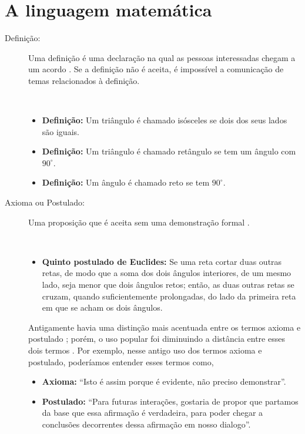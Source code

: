 
\section{A linguagem matemática}

\begin{description}

\item[Definição:]  Uma definição é uma declaração na qual as 
pessoas interessadas chegam a um acordo \cite[pp. 37]{solow1987como}.
Se a definição não é aceita, é impossível a comunicação de temas relacionados à definição.
\begin{example}~\\
\begin{itemize}
\item \textbf{Definição:} Um triângulo é chamado isósceles se dois dos seus lados são iguais.
\item \textbf{Definição:} Um triângulo é chamado retângulo se tem um ângulo com $90^{\circ}$.
\item \textbf{Definição:} Um ângulo é chamado reto se tem  $90^{\circ}$.
\end{itemize}
\end{example}

\item[Axioma ou Postulado:]   
Uma proposição que é aceita sem uma demonstração formal \cite[pp. 47]{fossa2009introducao} \cite[pp. 41]{solow1987como}.
\begin{example}~\\
\begin{itemize}
\item \textbf{Quinto postulado de Euclides:} 
Se uma reta cortar duas outras retas, de modo que a soma dos dois ângulos interiores, 
de um mesmo lado, seja menor que dois ângulos retos; então, as duas outras retas se cruzam, 
quando suficientemente prolongadas, do lado da primeira reta em que se acham os dois ângulos.
\end{itemize}
\end{example}

Antigamente havia uma distinção mais acentuada entre os termos axioma e postulado \cite[pp. 115]{de1863ensaio};
porém, o uso popular foi diminuindo a distância entre esses dois termos \cite[pp. 243]{mora2000dicionario}.
Por exemplo, nesse antigo uso dos termos axioma e postulado, poderíamos entender esses termos como,
\begin{itemize}
\item \textbf{Axioma:} ``Isto é assim porque é evidente, não preciso demonstrar''.
\item \textbf{Postulado:} ``Para futuras interações, 
gostaria de propor que partamos da base que essa afirmação é verdadeira,
 para poder chegar a conclusões decorrentes dessa afirmação em nosso dialogo''.
\end{itemize}



\end{description}
